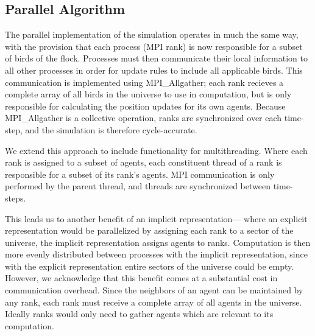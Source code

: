 \subsection*{Parallel Algorithm}
The parallel implementation of the simulation operates in much the
same way, with the provision that each process (MPI rank) is now
responsible for a subset of birds of the flock. Processes must then
communicate their local information to all other processes in order
for update rules to include all applicable birds. This communication
is implemented using MPI\_Allgather; each rank recieves a complete
array of all birds in the universe to use in computation, but is only
responsible for calculating the position updates for its own agents.
Because MPI\_Allgather is a collective operation, ranks are
synchronized over each time-step, and the simulation is therefore
cycle-accurate.

We extend this approach to include functionality for
multithreading. Where each rank is assigned to a subset of agents,
each constituent thread of a rank is responsible for a subset of
its rank's agents. MPI communication is only performed by the parent
thread, and threads are synchronized between time-steps.

This leads us to another benefit of an implicit representation---
where an explicit representation would be parallelized by assigning
each rank to a sector of the universe, the implicit representation
assigns agents to ranks. Computation is then more evenly distributed
between processes with the implicit representation, since with the
explicit representation entire sectors of the universe could be
empty. However, we acknowledge that this benefit comes at a
substantial cost in communication overhead. Since the neighbors of an
agent can be maintained by any rank, each rank must receive a complete
array of all agents in the universe. Ideally ranks would only need to
gather agents which are relevant to its computation.
